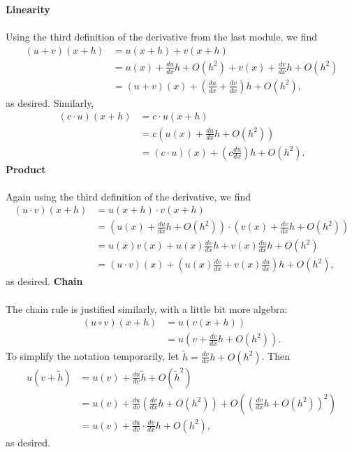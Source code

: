 \documentclass[twoside,openright,titlepage,a4paper]{book}
\begin{document}
\begin{sloppypar}
\begin{examplebox}
\textbf{Linearity}\\\\
Using the third definition of the derivative from the last module, we find
\begin{align*} 
(u+v)(x+h) &= u(x+h) + v(x+h) \\
&= u(x) + \frac{du}{dx}h + O(h^2) + v(x) + \frac{dv}{dx}h + O(h^2) \\
&= (u+v)(x) + \left(\frac{du}{dx}+\frac{dv}{dx}\right)h + O(h^2),
\end{align*}
as desired. Similarly,
\begin{align*}
(c \cdot u)(x+h) &= c \cdot u(x+h) \\
&= c \left(u(x) + \frac{du}{dx}h + O(h^2)\right) \\
&= (c\cdot u)(x) + \left( c \frac{du}{dx}\right) h + O(h^2). 
\end{align*}
\bigbreak
\textbf{Product}\\\\
Again using the third definition of the derivative, we find
\begin{align*}
(u\cdot v)(x+h) &= u(x+h)\cdot v(x+h) \\
&= \left(u(x) + \frac{du}{dx}h + O(h^2)\right)\cdot \left(v(x) + \frac{dv}{dx}h + O(h^2) \right) \\
&= u(x)v(x) + u(x)\frac{dv}{dx}h + v(x)\frac{du}{dx}h + O(h^2) \\
&= (u \cdot v)(x) + \left(u(x) \frac{dv}{dx} + v(x) \frac{du}{dx}\right)h + O(h^2),
\end{align*}
as desired.
\bigbreak
\textbf{Chain}\\\\
The chain rule is justified similarly, with a little bit more algebra:
\begin{align*}
(u \circ v)(x+h) &= u(v(x+h)) \\
&= u\left(v + \frac{dv}{dx}h + O(h^2)\right).
\end{align*}
To simplify the notation temporarily, let $\tilde h = \frac{dv}{dx}h + O(h^2)$. Then
\begin{align*}
u(v+\tilde h) &= u(v) + \frac{du}{dv}\tilde h + O(\tilde h^2) \\
&= u(v) + \frac{du}{dv}\left(\frac{dv}{dx}h + O(h^2)\right) + O((\frac{dv}{dx}h + O(h^2))^2) \\
&= u(v) + \frac{du}{dv} \cdot \frac{dv}{dx} h + O(h^2),
\end{align*}
as desired.	
\end{examplebox}


\end{sloppypar}
\end{document}
